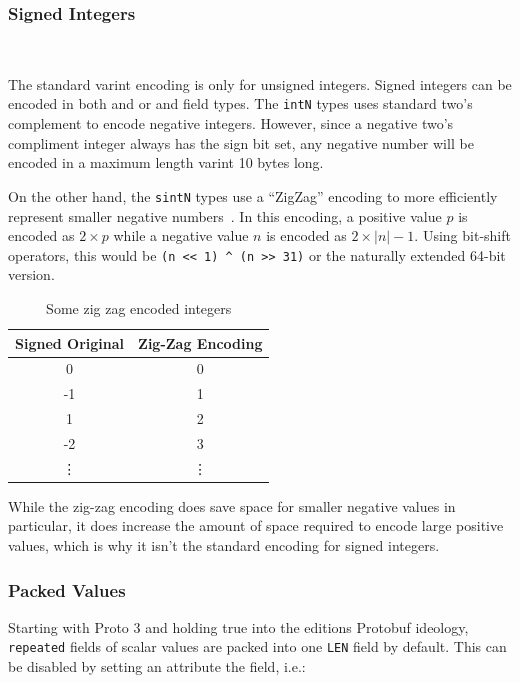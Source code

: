 \subsubsection{Signed Integers}~\label{sec:proto-sint}

The standard varint encoding is only for unsigned integers. Signed integers can
be encoded in both \ints{} and \intl{} or \sints{} and
\sintl{} field types. The \texttt{intN} types uses standard two's
complement to encode negative integers. However, since a negative two's
compliment integer always has the sign bit set, any negative number will be
encoded in a maximum length varint 10 bytes long.

On the other hand, the \texttt{sintN} types use a ``ZigZag'' encoding to more
efficiently represent smaller negative numbers~\cite{Encoding}. In this
encoding, a positive value $p$ is encoded as $2 \times p$ while a negative value $n$
is encoded as $2 \times |n| - 1$. Using bit-shift operators, this would be
\verb|(n << 1) ^ (n >> 31)| or the naturally extended 64-bit version.

\begin{table}[htbp]
  \centering
  \begin{tabular}{cc}
    \toprule
    Signed Original & Zig-Zag Encoding \\
    \midrule
    0 & 0 \\
    -1 & 1 \\
    1 & 2 \\
    -2 & 3 \\
    \vdots & \vdots \\
    \bottomrule
  \end{tabular}
\caption{Some zig zag encoded integers}\label{tab:zigzag}
\end{table}

While the zig-zag encoding does save space for smaller negative values in
particular, it does increase the amount of space required to encode large
positive values, which is why it isn't the standard encoding for signed
integers. 

\subsubsection{Packed Values}\label{sec:packed}

Starting with Proto 3 and holding true into the editions Protobuf ideology,
\texttt{repeated} fields of scalar values are packed into one \texttt{LEN}
field by default. This can be disabled by setting an attribute the field, i.e.:

